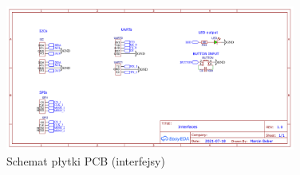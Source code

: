                 \begin{landscape}
                    \begin{figure}
                      \centering
                      \includegraphics[width=0.85\textwidth]{img/pcb3.png}
                      \caption{Schemat płytki PCB (interfejsy)}
                      \label{fig:pcb_schematic_3}
                    \end{figure}
                \end{landscape}